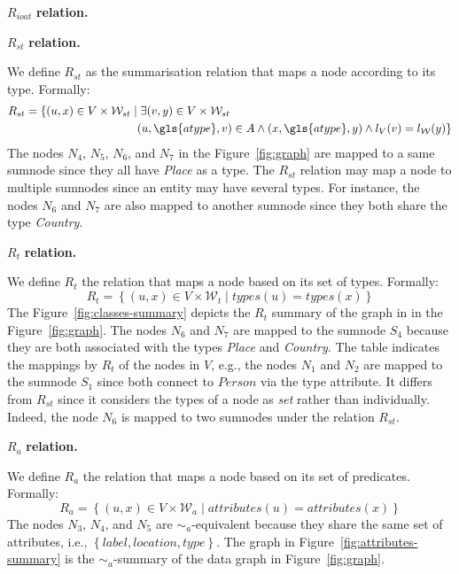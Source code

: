 \begin{labeling}{$R_{ioat}$ \textbf{relation.}}
\item[$R_{st}$ \textbf{relation.}]

We define $R_{st}$ as the summarisation relation that maps a node according to its type. Formally:
$$
\begin{aligned}
R_{st} = \{ (u, x) \in V \times \mathcal{W}_{st} \mid &\; \exists (v,y) \in V \times \mathcal{W}_{st} \\
 & (u,\gls{atype},v) \in A \wedge (x,\gls{atype},y) \wedge l_V(v) = l_\mathcal{W}(y) \}
\end{aligned}
$$
The nodes $N_4$, $N_5$, $N_6$, and $N_7$ in the Figure~\ref{fig:graph} are mapped to a same sumnode since they all have \emph{Place} as a type. The $R_{st}$ relation may map a node to multiple sumnodes since an entity may have several types. For instance, the nodes $N_6$ and $N_7$ are also mapped to another sumnode since they both share the type \emph{Country}.

\item[$R_t$ \textbf{relation.}]

We define $R_t$ the relation that maps a node based on its set of types. Formally:
$$
R_t = \left\lbrace (u, x) \in V \times \mathcal{W}_t \mid types(u) = types(x) \right\rbrace
$$
The Figure~\ref{fig:classes-summary} depicts the $R_t$ summary of the graph in in the Figure~\ref{fig:graph}. The nodes $N_6$ and $N_7$ are mapped to the sumnode $S_4$ because they are both associated with the types \emph{Place} and \emph{Country}. The table indicates the mappings by $R_t$ of the nodes in $V$, e.g., the nodes $N_1$ and $N_2$ are mapped to the sumnode $S_1$ since both connect to $Person$ via the type attribute. It differs from $R_{st}$ since it considers the types of a node as \emph{set} rather than individually. Indeed, the node $N_6$ is mapped to two sumnodes under the relation $R_{st}$.

\item[$R_a$ \textbf{relation.}]

We define $R_a$ the relation that maps a node based on its set of predicates. Formally:
$$
R_a = \left\lbrace (u, x) \in V \times \mathcal{W}_a \mid attributes(u) = attributes(x) \right\rbrace
$$
The nodes $N_3$, $N_4$, and $N_5$ are $\sim_a$-equivalent because they share the same set of attributes, i.e., $\left\lbrace label, location, type \right\rbrace$. The graph in Figure~\ref{fig:attributes-summary} is the $\sim_a$-summary of the data graph in Figure~\ref{fig:graph}.


\end{labeling}
